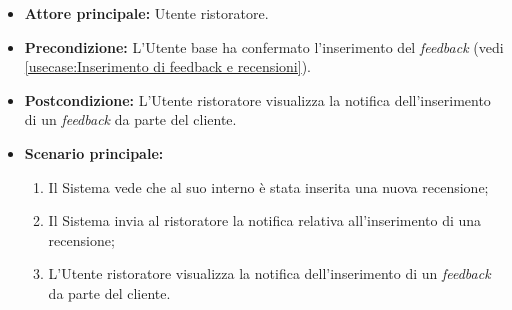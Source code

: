 \label{usecase:Visualizzazione notifica di inserimento feedback}
\begin{itemize}
	\item \textbf{Attore principale:} Utente ristoratore.
	
	\item \textbf{Precondizione:} L'Utente base ha confermato l'inserimento del \textit{feedback} (vedi \autoref{usecase:Inserimento di feedback e recensioni}).

	\item \textbf{Postcondizione:} L'Utente ristoratore visualizza la notifica dell'inserimento di un \textit{feedback} da parte del cliente.
     
	\item \textbf{Scenario principale:}
	      \begin{enumerate}
                \item Il Sistema vede che al suo interno è stata inserita una nuova recensione;
                \item Il Sistema invia al ristoratore la notifica relativa all'inserimento di una recensione;
                \item L'Utente ristoratore visualizza la notifica dell'inserimento di un \textit{feedback} da parte del cliente.
	      \end{enumerate}
\end{itemize}